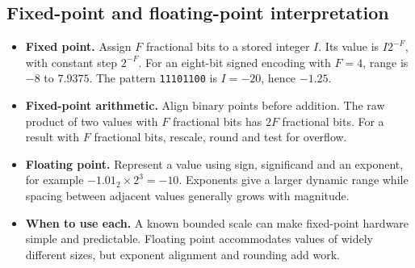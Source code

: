 \documentclass[12pt,a4paper]{article}
\begin{document}
\subsection{Fixed-point and floating-point interpretation}
\begin{itemize}[leftmargin=*,itemsep=4pt]
\item \textbf{Fixed point.} Assign $F$ fractional bits to a stored integer $I$. Its value is $I2^{-F}$, with constant step $2^{-F}$. For an eight-bit signed encoding with $F=4$, range is $-8$ to $7.9375$. The pattern \texttt{11101100} is $I=-20$, hence $-1.25$.
\item \textbf{Fixed-point arithmetic.} Align binary points before addition. The raw product of two values with $F$ fractional bits has $2F$ fractional bits. For a result with $F$ fractional bits, rescale, round and test for overflow.
\item \textbf{Floating point.} Represent a value using sign, significand and an exponent, for example $-1.01_2\times2^3=-10$. Exponents give a larger dynamic range while spacing between adjacent values generally grows with magnitude.
\item \textbf{When to use each.} A known bounded scale can make fixed-point hardware simple and predictable. Floating point accommodates values of widely different sizes, but exponent alignment and rounding add work.
\end{itemize}
\end{document}
